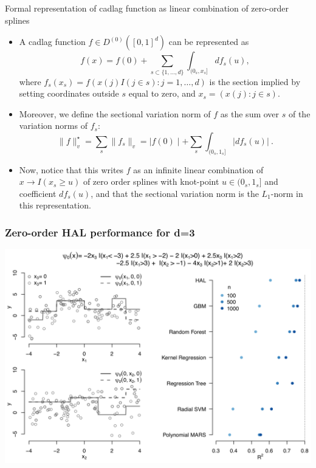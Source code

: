 \documentclass[t]{beamer}
\begin{document}
\begin{frame}{Formal representation of cadlag function as linear combination of zero-order splines}
\begin{itemize}
\item A cadlag function $f\in D^{(0)}([0,1]^d)$ can be represented as
\[
f(x)=f(0)+\sum_{s\subset\{1,\ldots,d\}}\int_{(0_s,x_s]}df_s(u),\]
where $f_s(x_s)=f(x(j)I(j\in s): j=1,\ldots,d)$ is the section implied by setting coordinates outside $s$ equal to zero, and $x_s=(x(j): j\in s)$.
\item Moreover, we define the sectional variation norm of $f$ as the sum over $s$ of the variation norms of $f_s$:
\[
\lVert f\rVert_v^{\star}=\sum_s \lVert f_s \rVert_v=\mid f(0)\mid +\sum_s
\int_{(0_s,1_s]}\lvert df_s(u)\rvert \ .
\]
\end{itemize}
\end{frame}
\begin{frame}
\begin{itemize}
\item Now, notice that this writes $f$ as an infinite linear combination of $x\rightarrow I(x_s\geq u)$ of zero order splines with knot-point $u\in (0_s,1_s]$ and coefficient $df_s(u)$, and that the sectional variation norm is the $L_1$-norm in this representation.
\end{itemize}
\end{frame}

\begin{frame}
\frametitle{Zero-order HAL performance for d=3}
  \vspace{-10pt}
  \begin{center}
  \includegraphics[width = 1\textwidth]{figures/HALworks.png}
  \end{center}
\end{frame}
\end{document}
